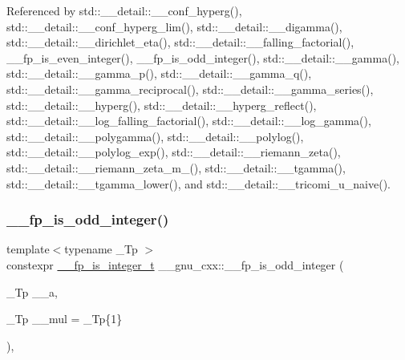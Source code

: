 Referenced by std\+::\+\_\+\+\_\+detail\+::\+\_\+\+\_\+conf\+\_\+hyperg(), std\+::\+\_\+\+\_\+detail\+::\+\_\+\+\_\+conf\+\_\+hyperg\+\_\+lim(), std\+::\+\_\+\+\_\+detail\+::\+\_\+\+\_\+digamma(), std\+::\+\_\+\+\_\+detail\+::\+\_\+\+\_\+dirichlet\+\_\+eta(), std\+::\+\_\+\+\_\+detail\+::\+\_\+\+\_\+falling\+\_\+factorial(), \+\_\+\+\_\+fp\+\_\+is\+\_\+even\+\_\+integer(), \+\_\+\+\_\+fp\+\_\+is\+\_\+odd\+\_\+integer(), std\+::\+\_\+\+\_\+detail\+::\+\_\+\+\_\+gamma(), std\+::\+\_\+\+\_\+detail\+::\+\_\+\+\_\+gamma\+\_\+p(), std\+::\+\_\+\+\_\+detail\+::\+\_\+\+\_\+gamma\+\_\+q(), std\+::\+\_\+\+\_\+detail\+::\+\_\+\+\_\+gamma\+\_\+reciprocal(), std\+::\+\_\+\+\_\+detail\+::\+\_\+\+\_\+gamma\+\_\+series(), std\+::\+\_\+\+\_\+detail\+::\+\_\+\+\_\+hyperg(), std\+::\+\_\+\+\_\+detail\+::\+\_\+\+\_\+hyperg\+\_\+reflect(), std\+::\+\_\+\+\_\+detail\+::\+\_\+\+\_\+log\+\_\+falling\+\_\+factorial(), std\+::\+\_\+\+\_\+detail\+::\+\_\+\+\_\+log\+\_\+gamma(), std\+::\+\_\+\+\_\+detail\+::\+\_\+\+\_\+polygamma(), std\+::\+\_\+\+\_\+detail\+::\+\_\+\+\_\+polylog(), std\+::\+\_\+\+\_\+detail\+::\+\_\+\+\_\+polylog\+\_\+exp(), std\+::\+\_\+\+\_\+detail\+::\+\_\+\+\_\+riemann\+\_\+zeta(), std\+::\+\_\+\+\_\+detail\+::\+\_\+\+\_\+riemann\+\_\+zeta\+\_\+m\+\_(), std\+::\+\_\+\+\_\+detail\+::\+\_\+\+\_\+tgamma(), std\+::\+\_\+\+\_\+detail\+::\+\_\+\+\_\+tgamma\+\_\+lower(), and std\+::\+\_\+\+\_\+detail\+::\+\_\+\+\_\+tricomi\+\_\+u\+\_\+naive().

\mbox{\label{namespace____gnu__cxx_a09bf2941743c58db8b086da401473c16}} 
\subsubsection{\texorpdfstring{\+\_\+\+\_\+fp\+\_\+is\+\_\+odd\+\_\+integer()}{\_\_fp\_is\_odd\_integer()}}
{\footnotesize\ttfamily template$<$typename \+\_\+\+Tp $>$ \\
constexpr \hyperlink{struct____gnu__cxx_1_1____fp__is__integer__t}{\+\_\+\+\_\+fp\+\_\+is\+\_\+integer\+\_\+t} \+\_\+\+\_\+gnu\+\_\+cxx\+::\+\_\+\+\_\+fp\+\_\+is\+\_\+odd\+\_\+integer (\begin{DoxyParamCaption}\item[{\+\_\+\+Tp}]{\+\_\+\+\_\+a,  }\item[{\+\_\+\+Tp}]{\+\_\+\+\_\+mul = {\ttfamily \+\_\+Tp\{1\}} }\end{DoxyParamCaption})\hspace{0.3cm}{\ttfamily [inline]}, {\ttfamily [noexcept]}}


